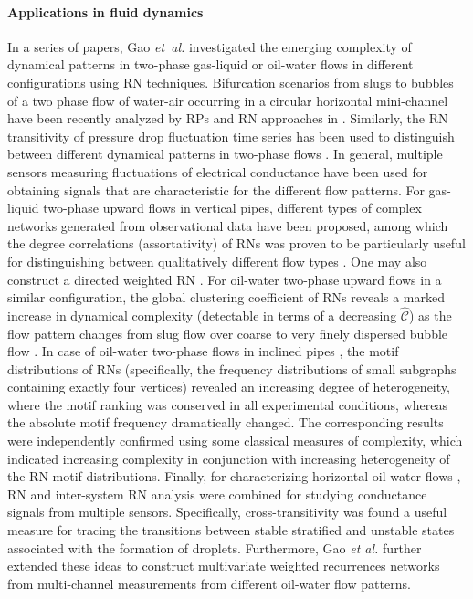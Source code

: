 		\paragraph{Applications in fluid dynamics}
		In a series of papers, Gao \textit{et~al.} investigated the emerging complexity of dynamical patterns in two-phase gas-liquid or oil-water flows in different configurations using RN techniques. Bifurcation scenarios from slugs to bubbles of a two phase flow of water-air occurring in a circular horizontal mini-channel have been recently analyzed by RPs and RN approaches in \cite{Gorski2015}. Similarly, the RN transitivity of pressure drop fluctuation time series has been used to distinguish between different dynamical patterns in two-phase flows \cite{Mosdorf2015}. In general, multiple sensors measuring fluctuations of electrical conductance have been used for obtaining signals that are characteristic for the different flow patterns. For gas-liquid two-phase upward flows in vertical pipes, different types of complex networks generated from observational data have been proposed, among which the degree correlations (assortativity) of RNs was proven to be particularly useful for distinguishing between qualitatively different flow types \cite{Gao2009,Gao2009a,Gao2010a}. One may also construct a directed weighted RN \cite{Gao2012,Gao2012a,Gao2013b,Gao2013d,Zhang2013b}. For oil-water two-phase upward flows in a similar configuration, the global clustering coefficient of RNs reveals a marked increase in dynamical complexity (detectable in terms of a decreasing $\hat{\mathcal{C}}$) as the flow pattern changes from slug flow over coarse to very finely dispersed bubble flow \cite{Gao2013,Gao2013c}. In case of oil-water two-phase flows in inclined pipes \cite{Gao2010}, the motif distributions of RNs (specifically, the frequency distributions of small subgraphs containing exactly four vertices) revealed an increasing degree of heterogeneity, where the motif ranking was conserved in all experimental conditions, whereas the absolute motif frequency dramatically changed. The corresponding results were independently confirmed using some classical measures of complexity, which indicated increasing complexity in conjunction with increasing heterogeneity of the RN motif distributions. Finally, for characterizing horizontal oil-water flows \cite{Gao2013,Gao2013d}, RN and inter-system RN analysis were combined for studying conductance signals from multiple sensors. Specifically, cross-transitivity was found a useful measure for tracing the transitions between stable stratified and unstable states associated with the formation of droplets. Furthermore, Gao {\textit{et al.}} \cite{Gao2015a,Gao2016,Gao2016b,Gao2016c} further extended these ideas to construct multivariate weighted recurrences networks from multi-channel measurements from different oil-water flow patterns.
        
